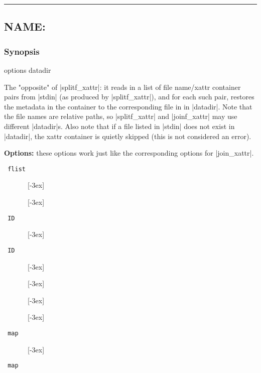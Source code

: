 \documentclass[11pt]{article}
\def\sepline{\begin{center}\rule{5in}{1pt}\end{center}}
\newcommand\BackSlash{\char92}
\newcommand\LeftBrace{\char123}
\newcommand\RightBrace{\char125}
\newenvironment{Quote}{\let\\\BackSlash\let\{\LeftBrace\let\}\RightBrace}{}
\begin{document}
\sepline


\subsection*{NAME: \tt{}}

\subsubsection*{Synopsis}

\begin{Quote}
\begin{Vrb}
    options datadir 
\end{Vrb}
\end{Quote}



The "opposite" of |splitf_xattr|:  
it reads in a list of file name/xattr container pairs from |stdin|
(as produced by |splitf_xattr|),
and for each such pair, restores the metadata in the
container to the corresponding file in
in |datadir|.
Note that the file names are relative paths, so |splitf_xattr|
and |joinf_xattr| may use different |datadir|s.
Also note that if a file listed in |stdin| does
not exist in |datadir|, the xattr container is 
quietly skipped (this is not considered an error).

\medbreak
{\bf Options:} these options work just like the
corresponding options for |join_xattr|.



\begin{description}
\item[{\tt {} flist}] \ \\[-3ex]
\item[{\tt{}}] \ \\[-3ex]
\item[{\tt{} ID}] \ \\[-3ex]
\item[{\tt{} ID}] \ \\[-3ex]
\item[{\tt {}}] \ \\[-3ex]
\item[{\tt {}}] \ \\[-3ex]
\item[{\tt {}}] \ \\[-3ex]
\item[{\tt {} map}] \ \\[-3ex]
\item[{\tt {} map}] 
\end{description}
\end{document}
